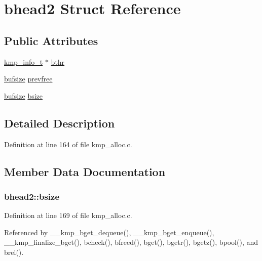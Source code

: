 \hypertarget{structbhead2}{\section{bhead2 Struct Reference}
\label{structbhead2}
}
\subsection*{Public Attributes}
\begin{DoxyCompactItemize}
\item 
\hyperlink{kmp_8h_a194859801fe16b326efe34501a37c30a}{kmp\-\_\-info\-\_\-t} $\ast$ \hyperlink{structbhead2_a641b1866310f899813f98a52a287a32e}{bthr}
\item 
\hyperlink{kmp__alloc_8c_acb70eb20828ff76ed9200989f7dcd043}{bufsize} \hyperlink{structbhead2_a2d15b44cc33113af141a1ed4e66f3ad0}{prevfree}
\item 
\hyperlink{kmp__alloc_8c_acb70eb20828ff76ed9200989f7dcd043}{bufsize} \hyperlink{structbhead2_a880c94691872eca4d73d3933c49a40cf}{bsize}
\end{DoxyCompactItemize}


\subsection{Detailed Description}


Definition at line 164 of file kmp\-\_\-alloc.\-c.



\subsection{Member Data Documentation}
\hypertarget{structbhead2_a880c94691872eca4d73d3933c49a40cf}{
\subsubsection[{bsize}]{ bhead2\-::bsize}}\label{structbhead2_a880c94691872eca4d73d3933c49a40cf}


Definition at line 169 of file kmp\-\_\-alloc.\-c.



Referenced by \-\_\-\-\_\-kmp\-\_\-bget\-\_\-dequeue(), \-\_\-\-\_\-kmp\-\_\-bget\-\_\-enqueue(), \-\_\-\-\_\-kmp\-\_\-finalize\-\_\-bget(), bcheck(), bfreed(), bget(), bgetr(), bgetz(), bpool(), and brel().

